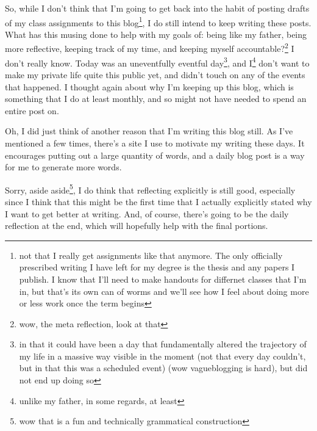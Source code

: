 \documentclass[12pt]{article}[titlepage]
\newcommand{\1}{\={a}}
\newcommand{\2}{\={e}}
\newcommand{\3}{\={\i}}
\newcommand{\4}{\=o}
\newcommand{\5}{\=u}
\newcommand{\6}{\={A}}
\renewcommand{\,}{\textsuperscript{,}}
\begin{document}
So, while I don't think that I'm going to get back into the habit of posting drafts of my class assignments to this blog\footnote{not that I really get assignments like that anymore. The only officially prescribed writing I have left for my degree is the thesis and any papers I publish. I know that I'll need to make handouts for differnet classes that I'm in, but that's its own can of worms and we'll see how I feel about doing more or less work once the term begins}, I do still intend to keep writing these posts.
What has this musing done to help with my goals of: being like my father, being more reflective, keeping track of my time, and keeping myself accountable?\footnote{wow, the meta reflection, look at that}
I don't really know.
Today was an uneventfully eventful day\footnote{in that it could have been a day that fundamentally altered the trajectory of my life in a massive way visible in the moment (not that every day couldn't, but in that this was a scheduled event) (wow vagueblogging is hard), but did not end up doing so}, and I\footnote{unlike my father, in some regards, at least} don't want to make my private life quite this public yet, and didn't touch on any of the events that happened.
I thought again about why I'm keeping up this blog, which is something that I do at least monthly, and so might not have needed to spend an entire post on.

Oh, I did just think of another reason that I'm writing this blog still.
As I've mentioned a few times, there's a site I use to motivate my writing these days.
It encourages putting out a large quantity of words, and a daily blog post is a way for me to generate more words.

Sorry, aside aside\footnote{wow that is a fun and technically grammatical construction}, I do think that reflecting explicitly is still good, especially since I think that this might be the first time that I actually explicitly stated why I want to get better at writing.
And, of course, there's going to be the daily reflection at the end, which will hopefully help with the final portions.
\end{document}
